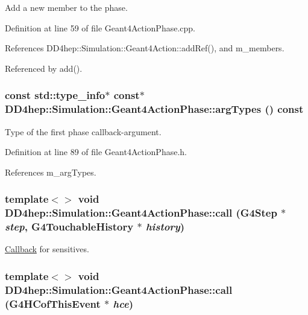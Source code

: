Add a new member to the phase. 

Definition at line 59 of file Geant4ActionPhase.cpp.

References DD4hep::Simulation::Geant4Action::addRef(), and m\_\-members.

Referenced by add().\hypertarget{class_d_d4hep_1_1_simulation_1_1_geant4_action_phase_ac481d5b2c86b3fd20ffc4adaf593a17a}{
\subsubsection[{argTypes}]{\setlength{\rightskip}{0pt plus 5cm}const std::type\_\-info$\ast$ const$\ast$ DD4hep::Simulation::Geant4ActionPhase::argTypes () const}}
\label{class_d_d4hep_1_1_simulation_1_1_geant4_action_phase_ac481d5b2c86b3fd20ffc4adaf593a17a}


Type of the first phase callback-\/argument. 

Definition at line 89 of file Geant4ActionPhase.h.

References m\_\-argTypes.\hypertarget{class_d_d4hep_1_1_simulation_1_1_geant4_action_phase_a23cbc92a4515243fc274f3a52f72dcc0}{
\subsubsection[{call}]{\setlength{\rightskip}{0pt plus 5cm}template$<$$>$ void DD4hep::Simulation::Geant4ActionPhase::call (G4Step $\ast$ {\em step}, \/  G4TouchableHistory $\ast$ {\em history})}}
\label{class_d_d4hep_1_1_simulation_1_1_geant4_action_phase_a23cbc92a4515243fc274f3a52f72dcc0}


\hyperlink{class_d_d4hep_1_1_callback}{Callback} for sensitives. \hypertarget{class_d_d4hep_1_1_simulation_1_1_geant4_action_phase_a8bf0c8fb01a1f6f20a4297bcb8cb300e}{
\subsubsection[{call}]{\setlength{\rightskip}{0pt plus 5cm}template$<$$>$ void DD4hep::Simulation::Geant4ActionPhase::call (G4HCofThisEvent $\ast$ {\em hce})}}
\label{class_d_d4hep_1_1_simulation_1_1_geant4_action_phase_a8bf0c8fb01a1f6f20a4297bcb8cb300e}


